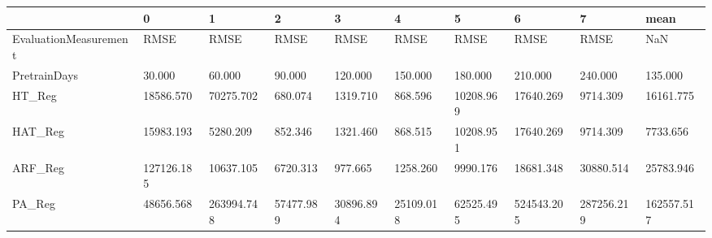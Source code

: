 \begin{tabular}{llllllllll}
\toprule
{} &          0 &          1 &         2 &         3 &         4 &         5 &          6 &          7 &       mean \\
\midrule
EvaluationMeasurement &       RMSE &       RMSE &      RMSE &      RMSE &      RMSE &      RMSE &       RMSE &       RMSE &        NaN \\
PretrainDays          &     30.000 &     60.000 &    90.000 &   120.000 &   150.000 &   180.000 &    210.000 &    240.000 &    135.000 \\
HT\_Reg                &  18586.570 &  70275.702 &   680.074 &  1319.710 &   868.596 & 10208.969 &  17640.269 &   9714.309 &  16161.775 \\
HAT\_Reg               &  15983.193 &   5280.209 &   852.346 &  1321.460 &   868.515 & 10208.951 &  17640.269 &   9714.309 &   7733.656 \\
ARF\_Reg               & 127126.185 &  10637.105 &  6720.313 &   977.665 &  1258.260 &  9990.176 &  18681.348 &  30880.514 &  25783.946 \\
PA\_Reg                &  48656.568 & 263994.748 & 57477.989 & 30896.894 & 25109.018 & 62525.495 & 524543.205 & 287256.219 & 162557.517 \\
\bottomrule
\end{tabular}
